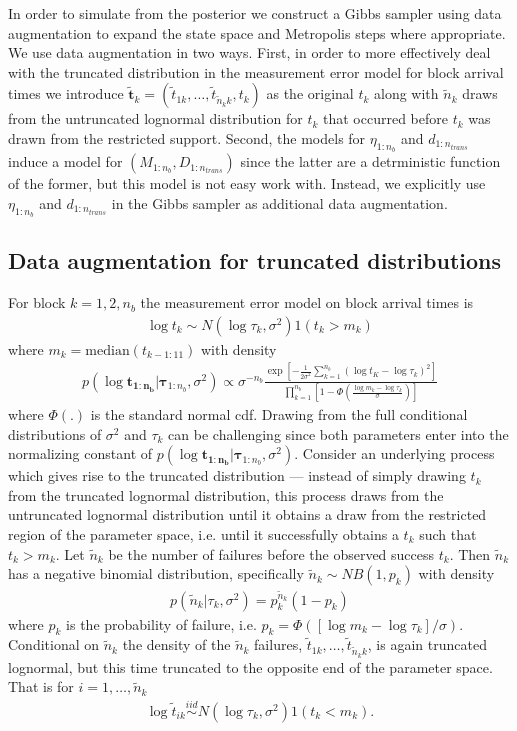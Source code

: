 \documentclass{article}
\begin{document}
In order to simulate from the posterior we construct a Gibbs sampler using data augmentation to expand the state space and Metropolis steps where appropriate. We use data augmentation in two ways. First, in order to more effectively deal with the truncated distribution in the measurement error model for block arrival times we introduce $\tilde{\bm{t}}_k=(\tilde{t}_{1k},\dots,\tilde{t}_{\tilde{n}_kk}, t_k)$ as the original $t_k$ along with $\tilde{n}_k$ draws from the untruncated lognormal distribution for $t_k$ that occurred before $t_k$ was drawn from the restricted support. Second, the models for $\eta_{1:n_{b}}$ and $d_{1:n_{trans}}$ induce a model for $(M_{1:n_{b}},D_{1:n_{trans}})$ since the latter are a detrministic function of the former, but this model is not easy work with. Instead, we explicitly use $\eta_{1:n_{b}}$ and $d_{1:n_{trans}}$ in the Gibbs sampler as additional data augmentation.

\subsection{Data augmentation for truncated distributions}
For block $k=1,2,n_{b}$ the measurement error model on block arrival times is
\begin{align*}
\log t_k \sim N(\log\tau_k,\sigma^2)1(t_k > m_k)
\end{align*}
where $m_k = \mathrm{median}(t_{k - 1:11})$ with density 
\begin{align*}
p(\log\bm{t_{1:n_{b}}}|\bm{\tau}_{1:n_{b}},\sigma^2) \propto \sigma^{-n_{b}}\frac{\exp\left[-\frac{1}{2\sigma^2}\sum_{k=1}^{n_{b}}(\log t_K - \log \tau_k)^2\right]}{\prod_{k=1}^{n_{b}}\left[1 - \Phi\left(\frac{\log m_k - \log\tau_k}{\sigma}\right)\right]}
\end{align*}
where $\Phi(.)$ is the standard normal cdf. Drawing from the full conditional distributions of $\sigma^2$ and $\tau_k$ can be challenging since both parameters enter into the normalizing constant of $p(\log\bm{t_{1:n_{b}}}|\bm{\tau}_{1:n_{b}},\sigma^2)$. Consider an underlying process which gives rise to the truncated distribution --- instead of simply drawing $t_k$ from the truncated lognormal distribution, this process draws from the untruncated lognormal distribution until it obtains a draw from the restricted region of the parameter space, i.e. until it successfully obtains a $t_k$ such that $t_k > m_k$. Let $\tilde{n}_k$ be the number of failures before the observed success $t_k$. Then $\tilde{n}_k$ has a negative binomial distribution, specifically $\tilde{n}_k \sim NB(1, p_k)$ with density
\begin{align*}
p(\tilde{n}_k|\tau_k,\sigma^2) = p_k^{\tilde{n}_k}(1 - p_k)
\end{align*}
where $p_k$ is the probability of failure, i.e. $p_k = \Phi([\log m_k - \log \tau_k]/\sigma)$. Conditional on $\tilde{n}_k$ the density of the $\tilde{n}_k$ failures, $\tilde{t}_{1k},\dots,\tilde{t}_{\tilde{n}_kk}$, is again truncated lognormal, but this time truncated to the opposite end of the parameter space. That is for $i = 1,\dots,\tilde{n}_k$
\begin{align*}
\log\tilde{t}_{ik}\stackrel{iid}{\sim}N(\log\tau_k,\sigma^2)1(t_k < m_k).
\end{align*}
\end{document}
